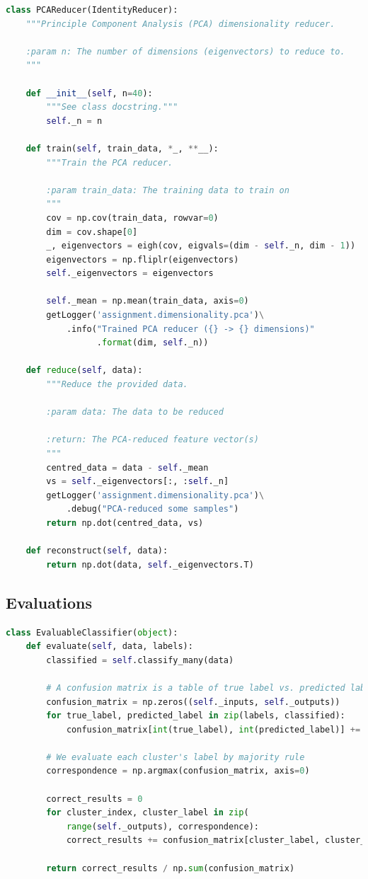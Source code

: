 \documentclass[a4paper, 11pt, twocolumn, final]{article} %
\begin{document}
\begin{lstlisting}[language=Python, style=python]
class PCAReducer(IdentityReducer):
    """Principle Component Analysis (PCA) dimensionality reducer.

    :param n: The number of dimensions (eigenvectors) to reduce to.
    """

    def __init__(self, n=40):
        """See class docstring."""
        self._n = n

    def train(self, train_data, *_, **__):
        """Train the PCA reducer.

        :param train_data: The training data to train on
        """
        cov = np.cov(train_data, rowvar=0)
        dim = cov.shape[0]
        _, eigenvectors = eigh(cov, eigvals=(dim - self._n, dim - 1))
        eigenvectors = np.fliplr(eigenvectors)
        self._eigenvectors = eigenvectors

        self._mean = np.mean(train_data, axis=0)
        getLogger('assignment.dimensionality.pca')\
            .info("Trained PCA reducer ({} -> {} dimensions)"
                  .format(dim, self._n))

    def reduce(self, data):
        """Reduce the provided data.

        :param data: The data to be reduced

        :return: The PCA-reduced feature vector(s)
        """
        centred_data = data - self._mean
        vs = self._eigenvectors[:, :self._n]
        getLogger('assignment.dimensionality.pca')\
            .debug("PCA-reduced some samples")
        return np.dot(centred_data, vs)

    def reconstruct(self, data):
        return np.dot(data, self._eigenvectors.T)
\end{lstlisting}

\subsection{Evaluations}
\begin{lstlisting}[language=Python, style=python]
class EvaluableClassifier(object):
    def evaluate(self, data, labels):
        classified = self.classify_many(data)

        # A confusion matrix is a table of true label vs. predicted label.
        confusion_matrix = np.zeros((self._inputs, self._outputs))
        for true_label, predicted_label in zip(labels, classified):
            confusion_matrix[int(true_label), int(predicted_label)] += 1

        # We evaluate each cluster's label by majority rule
        correspondence = np.argmax(confusion_matrix, axis=0)

        correct_results = 0
        for cluster_index, cluster_label in zip(
            range(self._outputs), correspondence):
            correct_results += confusion_matrix[cluster_label, cluster_index]

        return correct_results / np.sum(confusion_matrix)
\end{lstlisting}
\end{document}
